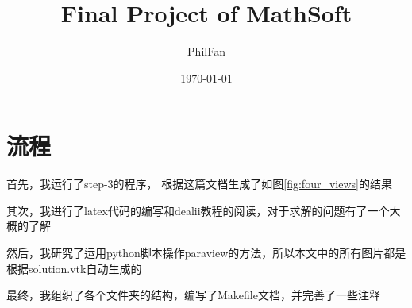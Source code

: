 \documentclass[12pt, a4paper]{article}
\title{Final Project of MathSoft}
\author{PhilFan}
\date{\today}
\numberwithin{equation}{section} %
\begin{document}
\maketitle
\setcounter{page}{0}
\maketitle
\thispagestyle{empty}


\newpage
{}
\setcounter{page}{1}
\tableofcontents

\newpage
\setcounter{page}{1}
\pagestyle{sectionheader} %


\section{流程}
首先，我运行了step-3的程序，
根据这篇文档\cite{refa}生成了如图\ref{fig:four_views}的结果

其次，我进行了latex代码的编写和dealii教程的阅读，对于求解的问题有了一个大概的了解

然后，我研究了运用python脚本操作paraview的方法，所以本文中的所有图片都是根据solution.vtk自动生成的

最终，我组织了各个文件夹的结构，编写了Makefile文档，并完善了一些注释
\end{document}
